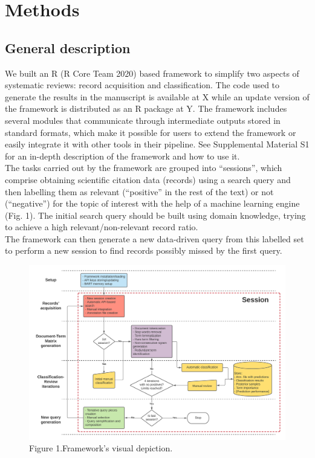 \documentclass{article}
\begin{document}
\hypertarget{methods}{%
\section{Methods}\label{methods}}

\hypertarget{general-description}{%
\subsection{General description}\label{general-description}}

We built an R (R Core Team 2020) based framework to simplify two aspects
of systematic reviews: record acquisition and classification. The code
used to generate the results in the manuscript is available at X while
an update version of the framework is distributed as an R package at Y.
The framework includes several modules that communicate through
intermediate outputs stored in standard formats, which make it possible
for users to extend the framework or easily integrate it with other
tools in their pipeline. See Supplemental Material S1 for an in-depth
description of the framework and how to use it.\\
The tasks carried out by the framework are grouped into ``sessions'',
which comprise obtaining scientific citation data (records) using a
search query and then labelling them as relevant (``positive'' in the
rest of the text) or not (``negative'') for the topic of interest with
the help of a machine learning engine (Fig. 1). The initial search query
should be built using domain knowledge, trying to achieve a high
relevant/non-relevant record ratio.\\
The framework can then generate a new data-driven query from this
labelled set to perform a new session to find records possibly missed by
the first query.\\

\begin{figure}
\includegraphics[width=1\linewidth]{methods_diagram} \caption{Figure 1.Framework's visual depiction.}\label{fig:method_diagram}
\end{figure}
\end{document}
